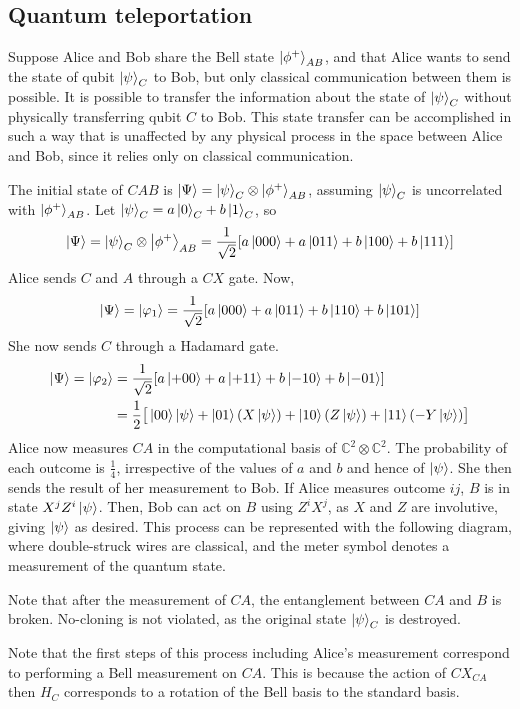 \subsection{Quantum teleportation}
Suppose Alice and Bob share the Bell state \( \ket{\phi^+}_{AB} \), and that Alice wants to send the state of qubit \( \ket{\psi}_C \) to Bob, but only classical communication between them is possible.
It is possible to transfer the information about the state of \( \ket{\psi}_C \) without physically transferring qubit \( C \) to Bob.
This state transfer can be accomplished in such a way that is unaffected by any physical process in the space between Alice and Bob, since it relies only on classical communication.

The initial state of \( C A B \) is \( \ket{\Psi} = \ket{\psi}_C \otimes \ket{\phi^+}_{AB} \), assuming \( \ket{\psi}_C \) is uncorrelated with \( \ket{\phi^+}_{AB} \).
Let \( \ket{\psi}_C = a \ket{0}_C + b \ket{1}_C \), so
\[ \ket{\Psi} = \ket{\psi}_C \otimes \ket{\phi^+}_{AB} = \frac{1}{\sqrt{2}} \qty[a \ket{000} + a \ket{011} + b \ket{100} + b \ket{111}] \]
Alice sends \( C \) and \( A \) through a \( CX \) gate.
Now,
\[ \ket{\Psi} = \ket{\varphi_1} = \frac{1}{\sqrt{2}} \qty[a \ket{000} + a \ket{011} + b \ket{110} + b \ket{101}] \]
She now sends \( C \) through a Hadamard gate.
\begin{align*}
    \ket{\Psi} = \ket{\varphi_2} &= \frac{1}{\sqrt{2}} \qty[a \ket{+00} + a \ket{+11} + b \ket{-10} + b \ket{-01}] \\
    &= \frac{1}{2} \big[\ket{00} \ket{\psi} + \ket{01} (X \ket{\psi}) + \ket{10} (Z \ket{\psi}) + \ket{11} (-Y\ket{\psi})\big]
\end{align*}
Alice now measures \( CA \) in the computational basis of \( \mathbb C^2 \otimes \mathbb C^2 \).
The probability of each outcome is \( \frac{1}{4} \), irrespective of the values of \( a \) and \( b \) and hence of \( \ket{\psi} \).
She then sends the result of her measurement to Bob.
If Alice measures outcome \( ij \), \( B \) is in state \( X^j Z^i \ket{\psi} \).
Then, Bob can act on \( B \) using \( Z^i X^j \), as \( X \) and \( Z \) are involutive, giving \( \ket{\psi} \) as desired.
This process can be represented with the following diagram, where double-struck wires are classical, and the meter symbol denotes a measurement of the quantum state.
\begin{center}
    \leavevmode
\end{center}
Note that after the measurement of \( CA \), the entanglement between \( CA \) and \( B \) is broken.
No-cloning is not violated, as the original state \( \ket{\psi}_C \) is destroyed.

Note that the first steps of this process including Alice's measurement correspond to performing a Bell measurement on \( CA \).
This is because the action of \( CX_{CA} \) then \( H_C \) corresponds to a rotation of the Bell basis to the standard basis.
